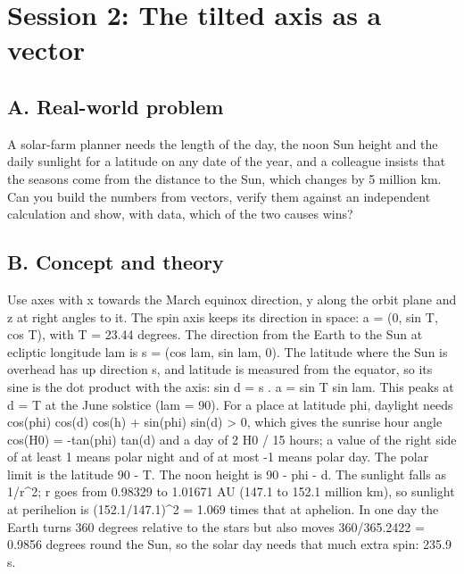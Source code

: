 \documentclass[11pt,a4paper]{article}
\begin{document}
\section{Session 2: The tilted axis as a vector}

\subsection*{A. Real-world problem}
A solar-farm planner needs the length of the day, the noon Sun height and the daily sunlight for a latitude on any date of the year, and a colleague insists that the seasons come from the distance to the Sun, which changes by 5 million km. Can you build the numbers from vectors, verify them against an independent calculation and show, with data, which of the two causes wins?

\subsection*{B. Concept and theory}
Use axes with x towards the March equinox direction, y along the orbit plane and z at right angles to it. The spin axis keeps its direction in space: a = (0, sin T, cos T), with T = 23.44 degrees. The direction from the Earth to the Sun at ecliptic longitude lam is s = (cos lam, sin lam, 0). The latitude where the Sun is overhead has up direction s, and latitude is measured from the equator, so its sine is the dot product with the axis: sin d = s . a = sin T sin lam. This peaks at d = T at the June solstice (lam = 90). For a place at latitude phi, daylight needs cos(phi) cos(d) cos(h) + sin(phi) sin(d) \textgreater{} 0, which gives the sunrise hour angle cos(H0) = -tan(phi) tan(d) and a day of 2 H0 / 15 hours; a value of the right side of at least 1 means polar night and of at most -1 means polar day. The polar limit is the latitude 90 - T. The noon height is 90 - \textbar{}phi - d\textbar{}. The sunlight falls as 1/r\textasciicircum{}2; r goes from 0.98329 to 1.01671 AU (147.1 to 152.1 million km), so sunlight at perihelion is (152.1/147.1)\textasciicircum{}2 = 1.069 times that at aphelion. In one day the Earth turns 360 degrees relative to the stars but also moves 360/365.2422 = 0.9856 degrees round the Sun, so the solar day needs that much extra spin: 235.9 s.
\end{document}
